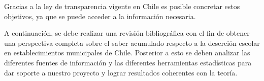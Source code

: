 Gracias a la ley de transparencia vigente en Chile es posible concretar estos objetivos, ya que se puede acceder a la información necesaria.

A continuación, se debe realizar una revisión bibliográfica con el fin de obtener una perspectiva completa sobre el saber acumulado respecto a la deserción escolar en establecimientos municipales de Chile. Posterior a esto se deben analizar las diferentes fuentes de información y las diferentes herramientas estadísticas para dar soporte a nuestro proyecto y lograr resultados coherentes con la teoría. 